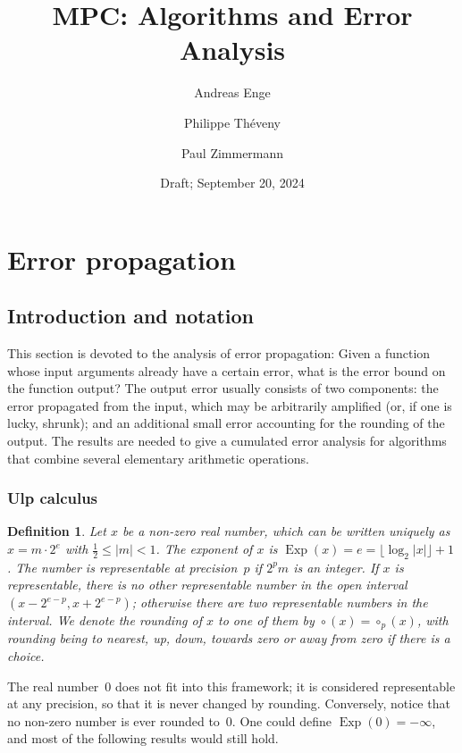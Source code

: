 \documentclass [11pt]{article}
\title {MPC: Algorithms and Error Analysis}
\author {Andreas Enge \and Philippe Th\'eveny \and Paul Zimmermann}
\date {Draft; September 20, 2024}
\DeclareMathOperator{\Exp}{\operatorname {Exp}}
\newcommand {\round}{\operatorname {\circ}}
\newtheorem{definition}[theorem]{Definition}
\begin{document}
\maketitle
\tableofcontents


\section {Error propagation}

\subsection {Introduction and notation}

This section is devoted to the analysis of error propagation: Given a function
whose input arguments already have a certain error, what is the error bound on
the function output? The output error usually consists of two components: the
error propagated from the input, which may be arbitrarily amplified (or, if
one is lucky, shrunk); and an
additional small error accounting for the rounding of the output. The results
are needed to give a cumulated error analysis for algorithms that combine
several elementary arithmetic operations.


\subsubsection {Ulp calculus}

\begin {definition}
\label {def:exp}
Let $x$ be a non-zero real number, which can be written uniquely as
$x = m \cdot 2^e$ with $\frac{1}{2} \le |m| < 1$.
The {\em exponent} of $x$ is
$\Exp(x) = e = \lfloor \log_2 |x| \rfloor + 1$.
The number is {\em representable at precision~$p$} if
$2^p m$ is an integer.
If $x$ is representable, there is no other representable number in the
open interval $(x - 2^{e-p}, x + 2^{e-p})$; otherwise there are two
representable numbers in the interval.
We denote the rounding of $x$ to one of them by
$\round (x) = \round_p (x)$, with rounding being to nearest, up, down,
towards zero or away from zero if there is a choice.
\end {definition}

The real number~$0$ does not fit into this framework; it is considered
representable at any precision, so that it is never changed by rounding.
Conversely, notice that no non-zero number is ever rounded to~$0$.
One could define $\Exp(0) = -\infty$, and most of the following results
would still hold.
\end{document}
